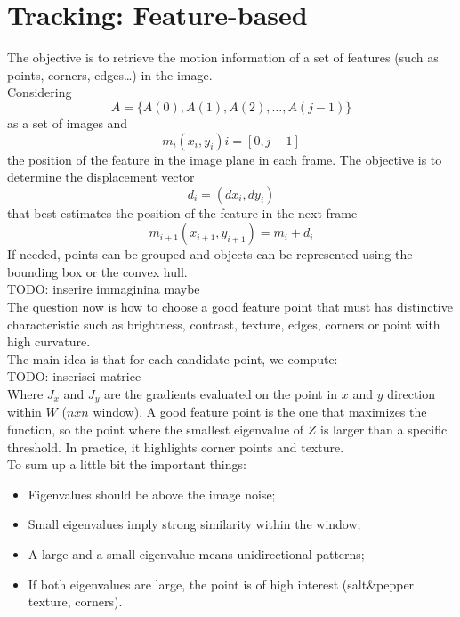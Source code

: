\section{Tracking: Feature-based}
The objective is to retrieve the motion information of a set of features (such as points, corners, edges\dots) in the image.
\\Considering
\[A = \{A(0), A(1), A(2), \dots, A(j-1)\}\] as a set of images and
\[m_i(x_i, y_i)i = [0, j-1] \] the position of the feature in the image plane in each frame.
The objective is to determine the displacement vector \[d_i = (dx_i, dy_i)\] that best estimates the position of the feature in the next frame \[m_{i+1}(x_{i+1}, y_{i+1}) = m_i + d_i\]
If needed, points can be grouped and objects can be represented using the bounding box or the convex hull.
\\TODO: inserire immaginina maybe
\\The question now is how to choose a good feature point that must has distinctive characteristic such as brightness, contrast, texture, edges, corners or point with high curvature.
\\The main idea is that for each candidate point, we compute: 
\\TODO: inserisci matrice
\\Where $J_x$ and $J_y$ are the gradients evaluated on the point in $x$ and $y$ direction within $W$ ($nxn$ window). 
A good feature point is the one that maximizes the function, so the point where the smallest eigenvalue of $Z$ is larger than a specific threshold.
In practice, it highlights corner points and texture.
\\To sum up a little bit the important things:
\begin{itemize}
    \item Eigenvalues should be above the image noise;
    \item Small eigenvalues imply strong similarity within the window;
    \item A large and a small eigenvalue means unidirectional patterns;
    \item If both eigenvalues are large, the point is of high interest (salt\&pepper texture, corners).
\end{itemize}

